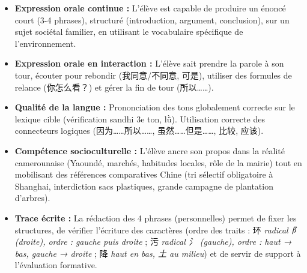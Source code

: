 \documentclass[11pt]{article}
\newcommand{\cle}[1]{{\popxbold\color{popdark}#1}}
\newcounter{popsec}
\newcounter{popsub}
\newcommand{\courssub}[1]{%
  \stepcounter{popsub}%
  \par\vspace{9pt}\noindent{\popxbold\fontsize{11.5}{13}\selectfont\color{popink}{\color{poporange}\thepopsec.\thepopsub}\hspace{6pt}#1}\par\nopagebreak\vspace{4pt}
}
\begin{document}
\courssub{Bilan de l'activité}
\begin{aretenir}
\begin{itemize}
    \item \textbf{Expression orale continue :} L'élève est capable de produire un énoncé court (3-4 phrases), structuré (introduction, argument, conclusion), sur un sujet sociétal familier, en utilisant le vocabulaire spécifique de l'environnement.
    \item \textbf{Expression orale en interaction :} L'élève sait prendre la parole à son tour, écouter pour rebondir (\cle{我同意/不同意}, \cle{可是}), utiliser des formules de relance (\cle{你怎么看？}) et gérer la fin de tour (\cle{所以……}).
    \item \textbf{Qualité de la langue :} Prononciation des tons globalement correcte sur le lexique cible (vérification sandhi 3e ton, \cle{lǜ}). Utilisation correcte des connecteurs logiques (\cle{因为……所以……}, \cle{虽然……但是……}, \cle{比较}, \cle{应该}).
    \item \textbf{Compétence socioculturelle :} L'élève ancre son propos dans la réalité camerounaise (Yaoundé, marchés, habitudes locales, rôle de la mairie) tout en mobilisant des références comparatives Chine (tri sélectif obligatoire à Shanghai, interdiction sacs plastiques, grande campagne de plantation d'arbres).
    \item \textbf{Trace écrite :} La rédaction des 4 phrases (personnelles) permet de fixer les structures, de vérifier l'écriture des caractères (ordre des traits : \cle{环} \textit{radical 阝 (droite), ordre : gauche puis droite} ; \cle{污} \textit{radical 氵 (gauche), ordre : haut → bas, gauche → droite} ; \cle{降} \textit{haut en bas, 土 au milieu}) et de servir de support à l'évaluation formative.
\end{itemize}
\end{aretenir}
\end{document}
